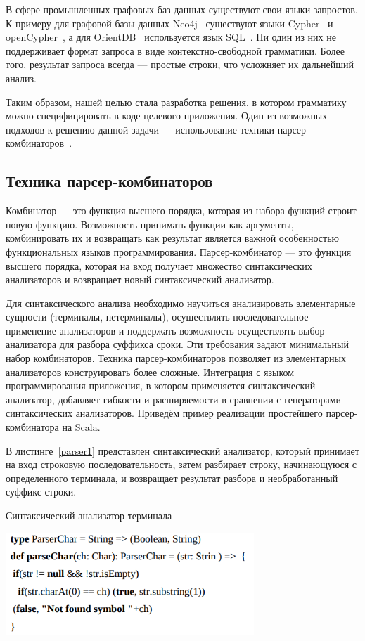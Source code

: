 В сфере промышленных графовых баз данных существуют свои языки запростов. К примеру для графовой базы данных Neo4j~\cite{Neo4j} существуют языки Cypher~\cite{Cypher} и openCypher~\cite{openCypher}, а для OrientDB~\cite{OrientDB} используется язык SQL~\cite{Sql}. Ни один из них не поддерживает формат запроса в виде контекстно-свободной грамматики. Более того, результат запроса всегда --- простые строки, что усложняет их дальнейший анализ.

Таким образом, нашей целью стала разработка решения, в котором грамматику можно специфицировать в коде целевого приложения. Один из возможных подходов к решению данной задачи --- использование техники парсер-комбинаторов~\cite{HOFunParsing}.

\subsection{Техника парсер-комбинаторов}
Комбинатор --- это функция высшего порядка, которая из набора функций строит новую функцию. Возможность принимать функции как аргументы, комбинировать их и возвращать как результат является важной особенностью функциональных языков программирования. Парсер-комбинатор --- это функция высшего порядка, которая на вход получает множество синтаксических анализаторов и возвращает новый синтаксический анализатор. 

Для синтаксического анализа необходимо научиться анализировать элементарные сущности (терминалы, нетерминалы), осуществлять последовательное применение анализаторов и поддержать возможность осуществлять выбор анализатора для разбора суффикса сроки. Эти требования задают минимальный набор комбинаторов. Техника парсер-комбинаторов позволяет из элементарных анализаторов конструировать более сложные. Интеграция с языком программирования приложения, в котором применяется синтаксический анализатор, добавляет гибкости и расширяемости в сравнении с генераторами синтаксических анализаторов. Приведём пример реализации простейшего парсер-комбинатора на Scala.

В листинге~\ref{parser1} представлен синтаксический анализатор, который принимает на вход строковую последовательность, затем разбирает строку, начинающуюся с определенного терминала, и возвращает результат разбора и необработанный суффикс строки.

\begin{listing}
\caption{Синтаксический анализатор терминала}
\label{parser1}
\centering
\includegraphics[width=0.7\textwidth]{Smolina/pics/parser1.png}
\end{listing}

